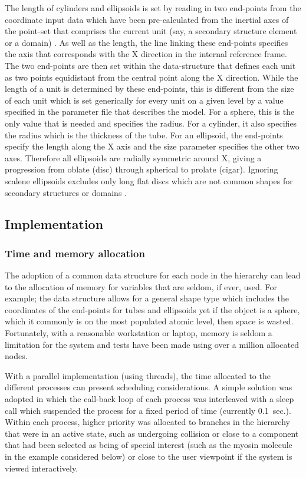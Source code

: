 The length of cylinders and ellipsoids is set by reading in two end-points from the
coordinate input data which have been pre-calculated from the inertial axes of
the point-set that comprises the current unit (say, a secondary structure element or
a domain) \cite{TaylorWRet83b}.  As well as the length, the line linking these end-points specifies the
axis that corresponds with the X direction in the internal reference frame. 
The two end-points are then set within the data-structure that defines each unit as
two points equidistant from the central point along the X direction.   While the length
of a unit is determined by these end-points, this is different from the size of each
unit which is set generically for every unit on a given level by a value specified in
the parameter file that describes the model.   For a sphere, this is the only value
that is needed and specifies the radius.  For a cylinder, it also specifies the
radius which is the thickness of the tube.  For an ellipsoid, the end-points specify
the length along the X axis and the size parameter specifies the other two axes.
Therefore all ellipsoids are radially symmetric around X, giving a progression from
oblate (disc) through spherical to prolate (cigar).  Ignoring scalene ellipsoids
excludes only long flat discs which are not common shapes for secondary structures
or domains \cite{AszodiAet94a}.

\subsection{Implementation}

\subsubsection{Time and memory allocation}

The adoption of a common data structure for each node in the hierarchy can lead
to the allocation of memory for variables that are seldom, if ever, used.  For
example; the data structure allows for a general shape type which includes
the coordinates of the end-points for tubes and ellipsoids yet if the object is
a sphere, which it commonly is on the most populated atomic level, then space
is wasted.   Fortunately, with a reasonable workstation or laptop, memory is
seldom a limitation for the system and tests have been made using over a 
million allocated nodes.

With a parallel implementation (using threads), the time allocated to the
different processes can present scheduling considerations.  A simple solution was
adopted in which the call-back loop of each process was interleaved with a
sleep call which suspended the process for a fixed period of time (currently 0.1~sec.).
Within each process, higher priority was allocated to branches in the hierarchy
that were in an active state, such as undergoing collision or close to a component
that had been selected as being of special interest (such as the myosin molecule
in the example considered below) or close to the user viewpoint if the system is 
viewed interactively.


